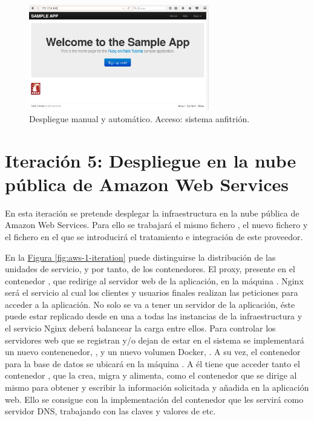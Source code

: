\begin{figure}[H]
\centering
\includegraphics[width=0.7\textwidth]{images/figures/coreosmanualhost.png}
\caption{Despliegue manual y automático. Acceso: sistema anfitrión.}
\end{figure}

\section[Iteración 5: Despliegue en Amazon Web Services]{Iteración 5: Despliegue en la nube pública de Amazon Web Services}

En esta iteración se pretende desplegar la infraestructura en la nube pública de Amazon Web Services. Para ello se trabajará el mismo fichero , el nuevo fichero  y el fichero  en el que se introducirá el tratamiento e integración de este proveedor.

En la \hyperref[fig:aws-1-iteration]{Figura \ref{fig:aws-1-iteration}} puede distinguirse la distribución de las unidades de servicio, y por tanto, de los contenedores. El proxy, presente en el contenedor , que redirige al servidor web de la aplicación, en la máquina . Nginx será el servicio al cual los clientes y usuarios finales realizan las peticiones para acceder a la aplicación. No solo se va a tener un servidor de la aplicación, éste puede estar replicado desde en una a todas las instancias de la infraestructura y el servicio Nginx deberá balancear la carga entre ellos. Para controlar los servidores web que se registran y/o dejan de estar en el sistema se implementará un nuevo contenenedor, , y un nuevo volumen Docker, . A su vez, el contenedor  para la base de datos se ubicará en la máquina . A él tiene que acceder tanto el contenedor , que la crea, migra y alimenta, como el contenedor  que se dirige al mismo para obtener y escribir la información solicitada y añadida en la aplicación web. Ello se consigue con la implementación del contenedor  que les servirá como servidor DNS, trabajando con las claves y valores de etc.

